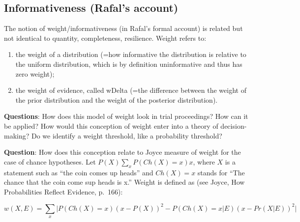 \documentclass[
  10pt,
  dvipsnames,enabledeprecatedfontcommands]{scrartcl}
\begin{document}

\hypertarget{informativeness-rafals-account}{%
\subsection{Informativeness (Rafal's
account)}\label{informativeness-rafals-account}}

The notion of weight/informativeness (in Rafal's formal account) is
related but not identical to quantity, completeness, resilience. Weight
refers to:

\begin{enumerate}
\def\labelenumi{(\alph{enumi})}
\item
  the weight of a distribution (=how informative the distribution is
  relative to the uniform distribution, which is by definition
  uninformative and thus has zero weight);
\item
  the weight of evidence, called wDelta (=the difference between the
  weight of the prior distribution and the weight of the posterior
  distribution).
\end{enumerate}

\textbf{Questions}: How does this model of weight look in trial
proceedings? How can it be applied? How would this conception of weight
enter into a theory of decision-making? Do we identify a weight
threshold, like a probability threshold?


\textbf{Question}: How does this conception relate to Joyce measure of
weight for the case of chance hypotheses. Let
\(P(X)\sum_x P(Ch(X)=x)x\), where \(X\) is a statement such as ``the
coin comes up heads'' and \(Ch(X)=x\) stands for ``The chance that the
coin come sup heads is x.'' Weight is defined as (see Joyce, How
Probabilities Reflect Evidence, p.~166):

\[w(X, E) = \sum_x \vert P(Ch(X)=x)(x-P(X))^2 - P(Ch(X)=x \vert E)(x-Pr(X \vert E))^2\vert\]

\end{document}
